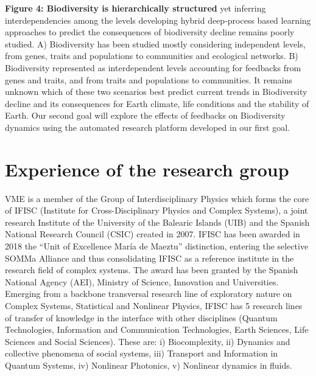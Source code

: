 \documentclass[authoryear,1p,12pt]{elsarticle}
\begin{document}
\caption{{\small {\bf Figure 4: Biodiversity is hierarchically
      structured} yet inferring interdependencies among the levels
    developing hybrid deep-process based learning approaches to
    predict the consequences of biodiversity decline remains poorly
    studied. A) Biodiversity has been studied mostly considering
    independent levels, from genes, traits and populations to
    communities and ecological networks. B) Biodiversity represented
    as interdependent levels accounting for feedbacks from genes and
    traits, and from traits and populations to communities. It remains
    unknown which of these two scenarios best predict current trends
    in Biodiversity decline and its consequences for Earth climate,
    life conditions and the stability of Earth. Our second goal will
    explore the effects of feedbacks on Biodiversity dynamics using
    the automated research platform developed in our first goal.}}
     
     \newpage
     \section{Experience of the research group}
     
     VME is a member of the Group of Interdisciplinary Physics which
     forms the core of IFISC (Institute for Cross-Disciplinary Physics
     and Complex Systems), a joint research Institute of the
     University of the Balearic Islands (UIB) and the Spanish National
     Research Council (CSIC) created in 2007. IFISC has been awarded
     in 2018 the “Unit of Excellence María de Maeztu” distinction,
     entering the selective SOMMa Alliance and thus consolidating
     IFISC as a reference institute in the research field of complex
     systems. The award has been granted by the Spanish National
     Agency (AEI), Ministry of Science, Innovation and
     Universities. Emerging from a backbone transversal research line
     of exploratory nature on Complex Systems, Statistical and
     Nonlinear Physics, IFISC has 5 research lines of transfer of
     knowledge in the interface with other disciplines (Quantum
     Technologies, Information and Communication Technologies, Earth
     Sciences, Life Sciences and Social Sciences). These are: i)
     Biocomplexity, ii) Dynamics and collective phenomena of social
     systems, iii) Transport and Information in Quantum Systems, iv)
     Nonlinear Photonics, v) Nonlinear dynamics in fluids.
\end{document}
